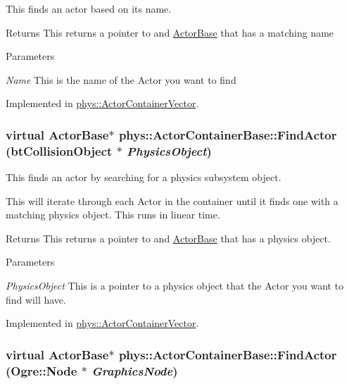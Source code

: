 This finds an actor based on its name. 

\begin{DoxyReturn}{Returns}
This returns a pointer to and \hyperlink{classphys_1_1ActorBase}{ActorBase} that has a matching name 
\end{DoxyReturn}

\begin{DoxyParams}{Parameters}
\item[{\em Name}]This is the name of the Actor you want to find \end{DoxyParams}


Implemented in \hyperlink{classphys_1_1ActorContainerVector_ae04f8c6dd9b07ef9c1456707be9e155b}{phys::ActorContainerVector}.

\hypertarget{classphys_1_1ActorContainerBase_a9ba6e38e0f12ada968cfee72fe5144d4}{
\subsubsection[{FindActor}]{\setlength{\rightskip}{0pt plus 5cm}virtual {\bf ActorBase}$\ast$ phys::ActorContainerBase::FindActor (btCollisionObject $\ast$ {\em PhysicsObject})}}
\label{d1/d00/classphys_1_1ActorContainerBase_a9ba6e38e0f12ada968cfee72fe5144d4}


This finds an actor by searching for a physics subsystem object. 

This will iterate through each Actor in the container until it finds one with a matching physics object. This runs in linear time. \begin{DoxyReturn}{Returns}
This returns a pointer to and \hyperlink{classphys_1_1ActorBase}{ActorBase} that has a physics object. 
\end{DoxyReturn}

\begin{DoxyParams}{Parameters}
\item[{\em PhysicsObject}]This is a pointer to a physics object that the Actor you want to find will have. \end{DoxyParams}


Implemented in \hyperlink{classphys_1_1ActorContainerVector_a5ebcdeb3018f3baf92154ddec79cd054}{phys::ActorContainerVector}.

\hypertarget{classphys_1_1ActorContainerBase_a2e4652bf92f24a0ff20bdc4a7173b567}{
\subsubsection[{FindActor}]{\setlength{\rightskip}{0pt plus 5cm}virtual {\bf ActorBase}$\ast$ phys::ActorContainerBase::FindActor (Ogre::Node $\ast$ {\em GraphicsNode})}}
\label{d1/d00/classphys_1_1ActorContainerBase_a2e4652bf92f24a0ff20bdc4a7173b567}


